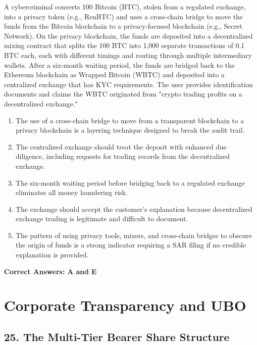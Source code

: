\documentclass[11pt,a4paper]{article}
\begin{document}
	A cybercriminal converts 100 Bitcoin (BTC), stolen from a regulated exchange, into a privacy token (e.g., RenBTC) and uses a cross-chain bridge to move the funds from the Bitcoin blockchain to a privacy-focused blockchain (e.g., Secret Network). On the privacy blockchain, the funds are deposited into a decentralized mixing contract that splits the 100 BTC into 1,000 separate transactions of 0.1 BTC each, each with different timings and routing through multiple intermediary wallets. After a six-month waiting period, the funds are bridged back to the Ethereum blockchain as Wrapped Bitcoin (WBTC) and deposited into a centralized exchange that has KYC requirements. The user provides identification documents and claims the WBTC originated from "crypto trading profits on a decentralized exchange."
	
	\begin{enumerate}[label=\Alph*.]
		\item The use of a cross-chain bridge to move from a transparent blockchain to a privacy blockchain is a layering technique designed to break the audit trail.
		\item The centralized exchange should treat the deposit with enhanced due diligence, including requests for trading records from the decentralized exchange.
		\item The six-month waiting period before bridging back to a regulated exchange eliminates all money laundering risk.
		\item The exchange should accept the customer's explanation because decentralized exchange trading is legitimate and difficult to document.
		\item The pattern of using privacy tools, mixers, and cross-chain bridges to obscure the origin of funds is a strong indicator requiring a SAR filing if no credible explanation is provided.
	\end{enumerate}
	
	\textbf{Correct Answers: A and E}
	
	\section{Corporate Transparency and UBO}
	
	\subsection{25. The Multi-Tier Bearer Share Structure}
	
\end{document}
